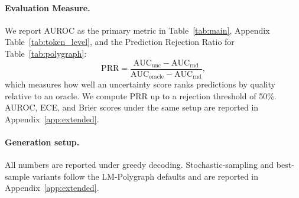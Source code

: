 \paragraph{Evaluation Measure.}
We report AUROC as the primary metric in
Table~\ref{tab:main}, Appendix Table~\ref{tab:token_level}, and
the Prediction Rejection Ratio
\citep{malinin2021uncertainty} for
Table~\ref{tab:polygraph}:
\begin{equation}
    \mathrm{PRR} = \frac{\mathrm{AUC}_{\mathrm{unc}} - \mathrm{AUC}_{\mathrm{rnd}}}{\mathrm{AUC}_{\mathrm{oracle}} - \mathrm{AUC}_{\mathrm{rnd}}},
    \label{eq:prr}
\end{equation}
which measures how well an uncertainty score ranks predictions by
quality relative to an oracle. We compute PRR up to a rejection
threshold of 50\%. AUROC, ECE, and Brier scores under the same
setup are reported in Appendix~\ref{app:extended}.

\paragraph{Generation setup.} All numbers are reported under
greedy decoding. Stochastic-sampling and best-sample variants
follow the LM-Polygraph defaults and are reported in
Appendix~\ref{app:extended}.
